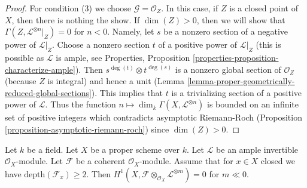 \begin{proof}
\medskip\noindent
For condition (3) we choose $\mathcal{G} = \mathcal{O}_Z$.
In this case, if $Z$ is a closed point of $X$, then there is
nothing the show. If $\dim(Z) > 0$, then we will show that
$\Gamma(Z, \mathcal{L}^{\otimes n}|_Z) = 0$
for $n < 0$. Namely, let $s$ be a nonzero section of a negative
power of $\mathcal{L}|_Z$. Choose a nonzero section $t$ of a positive
power of $\mathcal{L}|_Z$ (this is possible as $\mathcal{L}$ is ample, see
Properties, Proposition \ref{properties-proposition-characterize-ample}).
Then $s^{\deg(t)} \otimes t^{\deg(s)}$
is a nonzero global section of $\mathcal{O}_Z$
(because $Z$ is integral) and hence
a unit (Lemma \ref{lemma-proper-geometrically-reduced-global-sections}).
This implies that $t$ is a trivializing section
of a positive power of $\mathcal{L}$.
Thus the function $n \mapsto \dim_k \Gamma(X, \mathcal{L}^{\otimes n})$
is bounded on an infinite set of positive integers which contradicts
asymptotic Riemann-Roch
(Proposition \ref{proposition-asymptotic-riemann-roch})
since $\dim(Z) > 0$.
\end{proof}

\begin{lemma}
\label{lemma-vanishin-h1-negative}
Let $k$ be a field. Let $X$ be a proper scheme over $k$. Let $\mathcal{L}$
be an ample invertible $\mathcal{O}_X$-module. Let $\mathcal{F}$ be a
coherent $\mathcal{O}_X$-module. Assume that
for $x \in X$ closed we have $\text{depth}(\mathcal{F}_x) \geq 2$.
Then
$H^1(X, \mathcal{F} \otimes_{\mathcal{O}_X} \mathcal{L}^{\otimes m}) = 0$
for $m \ll 0$.
\end{lemma}

